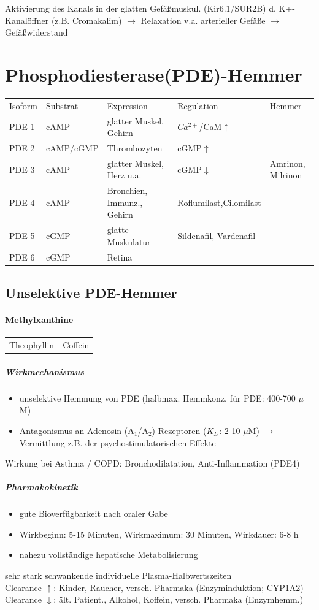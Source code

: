 \documentclass[10pt,a4paper]{report}
\begin{document}
Aktivierung des Kanals in der glatten Gefäßmuskul. (Kir6.1/SUR2B) d. K+-Kanalöffner (z.B. Cromakalim) $\rightarrow$ Relaxation v.a. arterieller Gefäße $\rightarrow$ Gefäßwiderstand 

\section{Phosphodiesterase(PDE)-Hemmer}

\begin{tabularx}{\textwidth}{XXXXX}
Isoform&Substrat&Expression&Regulation&Hemmer\\
PDE 1&cAMP&glatter Muskel, Gehirn&$Ca^{2+}$/CaM$\uparrow$\\  
PDE 2&cAMP/cGMP&Thrombozyten&cGMP$\uparrow$\\
PDE 3&cAMP&glatter Muskel, Herz u.a.&cGMP$\downarrow$&Amrinon, Milrinon\\
PDE 4&cAMP&Bronchien, Immunz., Gehirn&Roflumilast,Cilomilast\\
PDE 5&cGMP&glatte Muskulatur&Sildenafil, Vardenafil\\
PDE 6&cGMP&Retina&&\\
\end{tabularx}

\subsection{Unselektive PDE-Hemmer}
\paragraph{Methylxanthine}

\begin{tabularx}{\textwidth}{XX}
Theophyllin&Coffein\\
\end{tabularx}

\subparagraph{Wirkmechanismus}
\begin{itemize}
	\item unselektive Hemmung von PDE (halbmax. Hemmkonz. für PDE: 400-700 $\mu$ M) 
	\item Antagonismus an Adenosin (A$_1$/A$_2$)-Rezeptoren ($K_D$: 2-10 $\mu$M)
	$\rightarrow$ Vermittlung z.B. der psychostimulatorischen Effekte
\end{itemize}
Wirkung bei Asthma / COPD: Bronchodilatation, Anti-Inflammation (PDE4)

\subparagraph{Pharmakokinetik}
\begin{itemize}
	\item gute Bioverfügbarkeit nach oraler Gabe 
	\item Wirkbeginn: 5-15 Minuten, Wirkmaximum: 30 Minuten, Wirkdauer: 6-8 h
	\item nahezu vollständige hepatische Metabolisierung
\end{itemize}
sehr stark schwankende individuelle Plasma-Halbwertszeiten\\
Clearance $\uparrow$:	Kinder, Raucher, versch. Pharmaka (Enzyminduktion; CYP1A2)\\
Clearance $\downarrow$:	ält. Patient., Alkohol, Koffein, versch. Pharmaka (Enzymhemm.)
\end{document}
